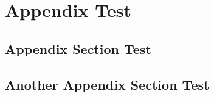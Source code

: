 
\chapter{Appendix Test}



\section{Appendix Section Test}





\section{Another Appendix Section Test}
